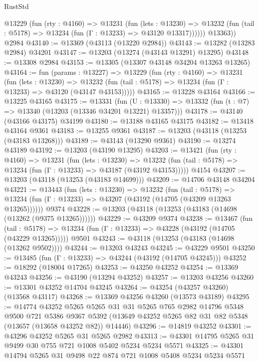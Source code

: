 \begin{lexlean}{RustStd}
\begin{coremodule}
          @13229
            (fun (rty : @4160) =>
            @13231
              (fun (lets : @13230) =>
              @13232 (fun (tail : @5178) => @13234 (fun (Γ : @13233) => @43120 @13317))))))
        @13363))
    @2984
@43140 := @13369 (@43113 (@13220 @2984))
@43143 := @13282 (@13283 @2984) @34201
@43147 := @13203 (@13274 (@43143 @13291) @13295)
@43148 := @13308 @2984
@43153 := @13305 (@13307 @43148 @34204 @13263 @13265)
@43164 := fun (params : @13227) =>
  @13229
    (fun (rty : @4160) =>
    @13231
      (fun (lets : @13230) =>
      @13232 (fun (tail : @5178) => @13234 (fun (Γ : @13233) => @43120 (@43147 @43153)))))
@43165 := @13228 @43164
@43166 := @13225 @43165
@43175 := @13331
    (fun (U : @13330) => @13332 (fun (t : @7) => @13340 (@13203 (@13346 @34201 @13221) @13357)))
@43178 := @43140 (@43166 @43175) @34199
@43180 := @13188 @43165 @43175
@43182 := @13418 @43164 @9361
@43183 := @13255 @9361
@43187 := @13203 (@43118 (@13253 (@43183 @13268)))
@43189 := @43143 (@13290 @9361)
@43190 := @13274 @43189
@43192 := @13203 (@43190 @13295)
@43203 := @13421
    (fun (rty : @4160) =>
    @13231
      (fun (lets : @13230) =>
      @13232 (fun (tail : @5178) => @13234 (fun (Γ : @13233) => @43187 (@43192 @43153)))))
    @4154
@43207 := @13203 (@43118 (@13253 (@43183 @14699)))
@43209 := @14706 @43148 @34204
@43221 := @13443
    (fun (lets : @13230) =>
    @13232
      (fun (tail : @5178) =>
      @13234 (fun (Γ : @13233) => @43207 (@43192 (@14705 (@43209 @13263 @13265))))))
    @9374
@43228 := @13203 (@43118 (@13253 (@43183 (@14698 (@13262 (@9375 @13265))))))
@43229 := @43209 @9374
@43238 := @13467
    (fun (tail : @5178) => @13234 (fun (Γ : @13233) => @43228 (@43192 (@14705 (@43229 @13265)))))
    @9501
@43243 := @43118 (@13253 (@43183 (@14698 (@13262 @9502))))
@43244 := @13203 @43243
@43245 := @43229 @9501
@43250 := @13485 (fun (Γ : @13233) => @43244 (@43192 (@14705 @43245)))
@43252 := @18292 (@18004 @17265)
@43253 := @43250 @43252
@43254 := @13369 @43243
@43256 := @43190 (@13294 @43252)
@43257 := @13203 @43256
@43260 := @13301 @43252 @14704 @43245
@43264 := @43254 (@43257 @43260) (@13568 @43117)
@43268 := @13369 @43256 @43260 (@13573 @43189)
@43295 := @14774
    @43252
    @5265
    @5265
    @31
    @31
    @5265
    @765
    @2982
    @14796
    @5348
    @9500
    @721
    @5386
    @9367
    @5392
    (@13649 @43252 @5265 @82 @31 @82 @5348 (@13657 (@13658 @43252 @82)) @14446)
@43296 := @14819 @43252
@43301 := @43296 @43252 @5265 @31 @5265 @2982
@43313 := @43301 @14795 @5265 @31 @9499 @30 @755 @721 @1008 @5402 @5234 @5234 @5571
@43325 := @43301 @14794 @5265 @31 @9498 @22 @874 @721 @1008 @5408 @5234 @5234 @5571

\end{coremodule}
\end{lexlean}

